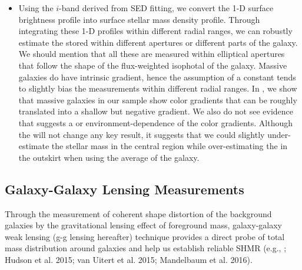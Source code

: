 \documentclass[fleqn,usenatbib,useAMS,english]{mnras}
\begin{document}
\begin{itemize}
		\item Using the $i$-band \mlratio{} derived from SED fitting, we convert the
			1-D surface brightness profile into surface stellar mass density profile.
            Through integrating these 1-D profiles within different radial ranges, we
            can robustly estimate the \mstar{} stored within different apertures or
            different parts of the galaxy.
            We should mention that all these \mstar{} are measured within elliptical
            apertures that follow the shape of the flux-weighted isophotal of the galaxy.
            Massive galaxies do have intrinsic \mlratio{} gradient, hence the assumption of
            a constant \mlratio{} tends to slightly bias the \mstar{} measurements within
            different radial ranges.
            In \citet{Huang2018b}, we show that massive galaxies in our sample show
            color gradients that can be roughly translated into a shallow but negative
            \mlratio{} gradient.
            We also do not see evidence that suggests a \mstar{} or environment-dependence
            of the color gradients.
            Although the \mlratio{} will not change any key result, it suggests that we
            could slightly under-estimate the stellar mass in the central region while
            over-estimating the \mstar{} in the outskirt when using the average \mlratio{}
            of the galaxy.

	\end{itemize}


\subsection{Galaxy-Galaxy Lensing Measurements}
    \label{sec:dsigma}

    Through the measurement of coherent shape distortion of the background galaxies by the
    gravitational lensing effect of foreground mass, galaxy-galaxy weak lensing (g-g lensing
    hereafter) technique provides a direct probe of total mass distribution around galaxies and
    help us establish reliable SHMR
    (e.g., \citealt{Coupon2015}; \addref{} Hudson et al. 2015; van Uitert et al. 2015;
    Mandelbaum et al. 2016).
\end{document}
